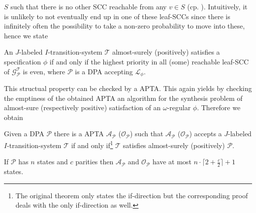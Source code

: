 $S$ such that there is no other \ac{SCC} reachable from any $v\in S$ (cp. 
\cite[Bottom-\ac{SCC}]{ComplexProbVerification}). Intuitively, it is unlikely 
to not eventually end up in one of these leaf-\acp{SCC} since there is 
infinitely often the possibility to take a non-zero probability to move into 
these, hence we state
\begin{lemma}
  \cite[Lemma 1]{SynProbEnv}
  An $J$-labeled $I$-transition-system $\mathcal{T}$ almost-surely (positively)
  satisfies a specification $\phi$ if and only if the highest priority in all
  (some) reachable leaf-\ac{SCC} of $\mathcal{G}_{\mathcal{P}}^{\mathcal{T}}$
  is even, where $\mathcal{P}$ is a \ac{DPA} accepting $\mathcal{L}_{\phi}$.
\end{lemma}
This structual property can be checked by a \ac{APTA}. This again yields by
checking the emptiness of the obtained \ac{APTA} an algorithm for the synthesis
problem of almost-sure (respectively positive) satisfaction of an 
$\omega$-regular $\phi$. Therefore we obtain
\begin{theorem}
  \cite[Theorem 1]{SynProbEnv}
  Given a \ac{DPA} $\mathcal{P}$ there is a \ac{APTA} 
  $\mathcal{A}_{\mathcal{P}}$ ($\mathcal{O}_{\mathcal{P}}$) such that 
  $\mathcal{A}_{\mathcal{P}}$ ($\mathcal{O}_{\mathcal{P}}$) accepts a 
  $J$-labeled $I$-transition-system $\mathcal{T}$ if and only 
  if\footnote{The original theorem only states the if-direction but the 
  corresponding proof deals with the only if-direction as well.} $\mathcal{T}$ 
  satisfies almost-surely (positively) $\mathcal{P}$.

  If $\mathcal{P}$ has $n$ states and $c$ parities then 
  $\mathcal{A}_{\mathcal{P}}$ and $\mathcal{O}_{\mathcal{P}}$ have at most
  $n\cdot\lceil 2 + \frac{c}{2}\rceil + 1$ states.
  \label{thm:probenvsynthesis}
\end{theorem}
